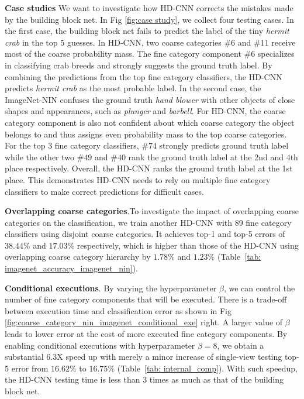 \documentclass[10pt,twocolumn,letterpaper]{article}
\begin{document}
\noindent \textbf{Case studies} We want to investigate how HD-CNN corrects the mistakes made by the building block net. In Fig \ref{fig:case study}, we collect four testing cases. In the first case, the building block net fails to predict the label of the tiny \textit{hermit crab} in the top 5 guesses. In HD-CNN, two coarse categories $\#6$ and $\#11$ receive most of the coarse probability mass. The fine category component $\#6$ specializes in classifying crab breeds and strongly suggests the ground truth label. By combining the predictions from the top fine category classifiers, the HD-CNN predicts \textit{hermit crab} as the most probable label. In the second case, the ImageNet-NIN confuses the ground truth \textit{hand blower} with other objects of close shapes and appearances, such as \textit{plunger} and \textit{barbell}. For HD-CNN, the coarse category component is also not confident about which coarse category the object belongs to and thus assigns even probability mass to the top coarse categories. For the top 3 fine category classifiers, $\#74$ strongly predicts ground truth label while the other two $\#49$ and $\#40$ rank the ground truth label at the 2nd and 4th place respectively. Overall, the HD-CNN ranks the ground truth label at the 1st place. This demonstrates HD-CNN needs to rely on multiple fine category classifiers to make correct predictions for difficult cases.






\noindent \textbf{Overlapping coarse categories}.To investigate the impact of overlapping coarse categories on the classification, we train another HD-CNN with 89 fine category classifiers using disjoint coarse categories. It achieves top-1 and top-5 errors of $38.44\%$ and $17.03\%$ respectively, which is higher than those of the HD-CNN using overlapping coarse category hierarchy by $1.78\%$ and $1.23\%$ (Table~\ref{tab: imagenet_accuracy_imagenet_nin}).

\noindent \textbf{Conditional executions}. By varying the hyperparameter $\beta$, we can control the number of fine category components that will be executed. There is a trade-off between execution time and classification error as shown in Fig  \ref{fig:coarse_category_nin_imagenet_conditional_exe} right. A larger value of $\beta$ leads to lower error at the cost of more executed fine category components. By enabling conditional executions with hyperparameter $\beta=8$, we obtain a substantial $6.3$X speed up with merely a minor increase of single-view testing top-5 error from $16.62\%$ to $16.75\%$ (Table~\ref{tab: internal_comp}). With such speedup, the HD-CNN testing time is less than $3$ times as much as that of the building block net.
\end{document}
